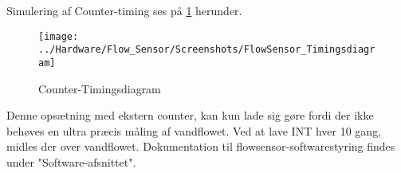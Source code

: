 Simulering af Counter-timing ses på  \ref{screenshot:counterTiming} herunder.

\begin{figure}[H]
	\centering
	\texttt{[image: ../Hardware/Flow\_Sensor/Screenshots/FlowSensor\_Timingsdiagram]}
	\caption{Counter-Timingsdiagram}
	\label{screenshot:counterTiming}
\end{figure}

Denne opsætning med ekstern counter, kan kun lade sig gøre fordi der ikke behøves en ultra præcis måling af vandflowet. 
Ved at lave INT hver 10 gang, midles der over vandflowet. 
Dokumentation til flowsensor-softwarestyring findes under "Software-afsnittet".
